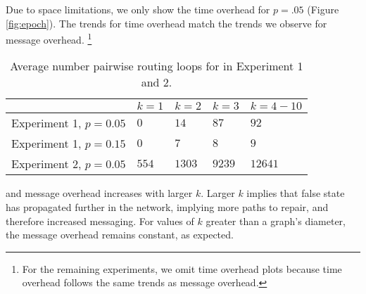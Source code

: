 Due to space limitations, we only show the time overhead for $p=.05$ (Figure \ref{fig:epoch}). The trends for time overhead match the trends we observe for message overhead. 
{\footnote {\small For the remaining experiments, we omit time overhead plots because time overhead follows the same trends as message overhead.}}

\begin{table}
\begin{center}
\begin{tabular}{l|l|l|l|l}
 & $k=1$&  $k=2$ & $k=3$ & $k=4-10$ \\
\hline
 Experiment 1, $p=0.05$  & $0$ & $14$ & $87$ &  $92$ \\
 Experiment 1, $p=0.15$  & $0$ & $7$&  $8$ & $9$ \\
 Experiment 2, $p=0.05$  & $554$ & $1303$ & $9239$ &  $12641$ \\
\end{tabular}
\end{center}
\caption{Average number pairwise routing loops for \second in Experiment 1 and 2.}
\label{tab:loop1}
\end{table}


\purge and \second message overhead increases with larger $k$. Larger $k$ implies that false state has propagated further in the network, 
implying more paths to repair, and therefore increased messaging.
For values of $k$ greater than a graph's diameter, the message overhead remains constant, as expected. 



